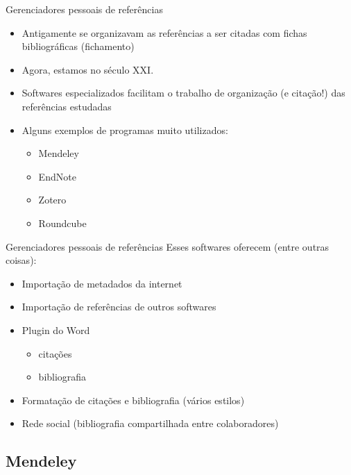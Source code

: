 \documentclass{beamer}
\begin{document}
\begin{frame}{Gerenciadores pessoais de referências}
  \begin{itemize}
    \footnotesize
  \item Antigamente se organizavam as referências a ser citadas com
    fichas bibliográficas (fichamento)
    \medskip
  \item Agora, estamos no século XXI.
    \medskip
  \item Softwares especializados facilitam o trabalho de organização
    (e citação!) das referências estudadas
    \medskip
  \item Alguns exemplos de programas muito utilizados:
    \begin{itemize}
      \scriptsize
    \item \alert<2->{Mendeley}
    \item EndNote
    \item Zotero
    \item Roundcube
    \end{itemize}
  \end{itemize}
\end{frame}

\begin{frame}{Gerenciadores pessoais de referências}
  \footnotesize
  Esses softwares oferecem (entre outras coisas):
  \bigskip
  \begin{itemize}
    \footnotesize
  \item Importação de metadados da internet
    \medskip
  \item Importação de referências de outros softwares
    \medskip
  \item Plugin do Word
    \begin{itemize}
      \scriptsize
    \item<2-> citações
    \item<2-> bibliografia
    \end{itemize}
    \medskip
  \item Formatação de citações e bibliografia ({\scriptsize vários estilos})
    \medskip
  \item Rede social ({\scriptsize bibliografia compartilhada entre colaboradores})
  \end{itemize}
\end{frame}

\subsection{Mendeley}
\end{document}
